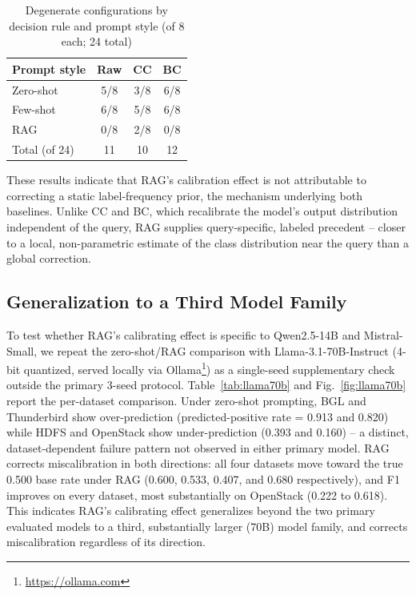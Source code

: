 \documentclass[10pt,conference]{IEEEtran}
\begin{document}
\begin{table}[t]
\centering
\caption{Degenerate configurations by decision rule and prompt style (of 8 each; 24 total)}
\label{tab:calib-baselines}
\begin{tabular}{lccc}
\toprule
Prompt style & Raw & CC & BC \\
\midrule
Zero-shot & 5/8 & 3/8 & 6/8 \\
Few-shot  & 6/8 & 5/8 & 6/8 \\
RAG       & 0/8 & 2/8 & 0/8 \\
\midrule
Total (of 24) & 11 & 10 & 12 \\
\bottomrule
\end{tabular}
\end{table}

These results indicate that RAG's calibration effect is not attributable
to correcting a static label-frequency prior, the mechanism underlying
both baselines. Unlike CC and BC, which recalibrate the model's output
distribution independent of the query, RAG supplies query-specific,
labeled precedent -- closer to a local, non-parametric estimate of the
class distribution near the query than a global correction.

\subsection{Generalization to a Third Model Family}
\label{sec:llama70b}

To test whether RAG's calibrating effect is specific to Qwen2.5-14B and
Mistral-Small, we repeat the zero-shot/RAG comparison with
Llama-3.1-70B-Instruct (4-bit quantized, served locally via
Ollama\footnote{\url{https://ollama.com}}) as a single-seed supplementary
check outside the primary 3-seed protocol. Table~\ref{tab:llama70b} and
Fig.~\ref{fig:llama70b} report the per-dataset comparison. Under
zero-shot prompting, BGL and
Thunderbird show over-prediction (predicted-positive rate = 0.913 and
0.820) while HDFS and OpenStack show under-prediction (0.393 and 0.160)
-- a distinct, dataset-dependent failure pattern not observed in either
primary model. RAG corrects miscalibration in both directions: all four
datasets move toward the true 0.500 base rate under RAG (0.600, 0.533,
0.407, and 0.680 respectively), and F1 improves on every dataset, most
substantially on OpenStack (0.222 to 0.618). This indicates RAG's
calibrating effect generalizes beyond the two primary evaluated models to
a third, substantially larger (70B) model family, and corrects
miscalibration regardless of its direction.
\end{document}
